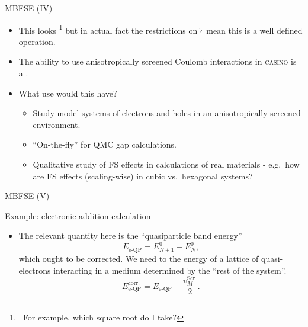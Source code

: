 \documentclass[12pt, pdf, hyperref={draft}, usenames, dvipsnames,
aspectratio=169]{beamer}
\newcommand{\red}[1]{{\bf\color{LancsRed}{#1}}}
\newcommand{\blue}[1]{{\bf\color{NavyBlue}{#1}}}
\newcommand{\green}[1]{{\bf\color{ForestGreen}{#1}}}
\begin{document}
\begin{frame}{MBFSE (IV)}

\begin{itemize}

  \item This looks \red{sketchy}\footnote{\ For example, which square
  root do I take?} but in actual fact the restrictions on $\tilde\epsilon$ mean
  this is a well defined operation.

  \item The ability to use anisotropically screened Coulomb interactions in
  \textsc{casino} is a \green{planned feature}.

  \item What use would this have?

  \begin{itemize}

  \item Study model systems of electrons and holes in an anisotropically
  screened environment.

  \item ``On-the-fly'' \blue{corrections} for QMC gap calculations.

  \item Qualitative study of FS effects in calculations of real materials -
  e.g.\ how are FS effects \blue{qualitatively different} (scaling-wise) in
  cubic vs.\ hexagonal systems?


  \end{itemize}
\end{itemize}
\end{frame}


\begin{frame}{MBFSE (V)}

\begin{block}{Example: electronic addition calculation}

\begin{itemize}
  \item The relevant quantity here is the ``quasiparticle band energy''
  \begin{equation}
    E_{\text{e-QP}} = E^{0}_{N+1} - E^{0}_{N},
  \end{equation}
  which ought to be corrected. We need to \blue{remove} the energy of a lattice
  of quasi-electrons interacting in a medium determined by the ``rest of the
  system''.
  \begin{equation}
    E^{\text{corr.}}_{\text{e-QP}} = E_{\text{e-QP}} -
    \dfrac{v^{\text{Scr.}}_{M}}{2}.
  \end{equation}
\end{itemize}
\end{block}
\end{frame}
\end{document}
